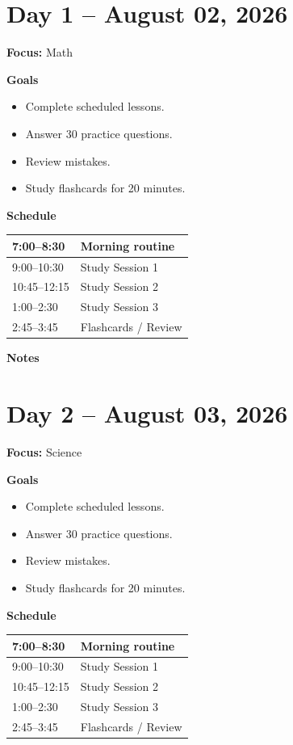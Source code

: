 
\section*{Day 1 -- August 02, 2026}
\textbf{Focus:} Math

\textbf{Goals}
\begin{itemize}
\item Complete scheduled lessons.
\item Answer 30 practice questions.
\item Review mistakes.
\item Study flashcards for 20 minutes.
\end{itemize}

\textbf{Schedule}
\begin{tabular}{|p{4cm}|p{10cm}|}\hline
7:00--8:30 & Morning routine \\\hline
9:00--10:30 & Study Session 1 \\\hline
10:45--12:15 & Study Session 2 \\\hline
1:00--2:30 & Study Session 3 \\\hline
2:45--3:45 & Flashcards / Review \\\hline
\end{tabular}

\vspace{1em}
\textbf{Notes}

\vspace{8cm}

\newpage

\section*{Day 2 -- August 03, 2026}
\textbf{Focus:} Science

\textbf{Goals}
\begin{itemize}
\item Complete scheduled lessons.
\item Answer 30 practice questions.
\item Review mistakes.
\item Study flashcards for 20 minutes.
\end{itemize}

\textbf{Schedule}
\begin{tabular}{|p{4cm}|p{10cm}|}\hline
7:00--8:30 & Morning routine \\\hline
9:00--10:30 & Study Session 1 \\\hline
10:45--12:15 & Study Session 2 \\\hline
1:00--2:30 & Study Session 3 \\\hline
2:45--3:45 & Flashcards / Review \\\hline
\end{tabular}

